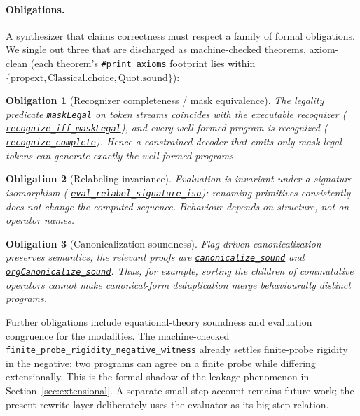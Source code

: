 \documentclass[11pt]{article}
\newcommand{\code}[1]{\texttt{#1}}
\newcommand{\formalcommit}{f3a31db36bb2f944312ee31c1d86c2758109e83a}
\newcommand{\formalblob}{https://github.com/zariuq/MeTTapedia/blob/\formalcommit/lean/mettapedia/Mettapedia}
\newcommand{\leansource}[3]{%
  \href{\formalblob/#1\#L#2}{\nolinkurl{#3}}}
\newtheorem{obligation}{Obligation}
\begin{document}
\paragraph{Obligations.} A synthesizer that claims correctness must respect a family of
formal obligations. We single out three that are discharged as machine-checked theorems,
axiom-clean (each theorem's \code{\#print axioms} footprint lies within
$\{\text{propext}, \text{Classical.choice}, \text{Quot.sound}\}$):
\begin{obligation}[Recognizer completeness / mask equivalence]
The legality predicate \code{maskLegal} on token streams coincides with the executable
recognizer (\leansource{GSLT/LanguageDef/Gauthier/E1.lean}{406-L415}{recognize_iff_maskLegal}),
and every well-formed program is recognized
(\leansource{GSLT/LanguageDef/Gauthier/E1.lean}{492-L499}{recognize_complete}).
Hence a constrained decoder that emits only mask-legal tokens
can generate exactly the well-formed programs.
\end{obligation}
\begin{obligation}[Relabeling invariance]
Evaluation is invariant under a signature isomorphism
(\leansource{GSLT/LanguageDef/Gauthier/E1.lean}{1612-L1628}{eval_relabel_signature_iso}):
renaming primitives consistently does not change the
computed sequence. Behaviour depends on structure, not on operator names.
\end{obligation}
\begin{obligation}[Canonicalization soundness]
Flag-driven canonicalization preserves semantics; the relevant proofs are
\leansource{GSLT/LanguageDef/Gauthier/E1.lean}{1431-L1437}{canonicalize_sound} and
\leansource{GSLT/LanguageDef/Gauthier/E1.lean}{1816-L1823}{orgCanonicalize_sound}.
Thus, for example, sorting the
children of commutative operators cannot make canonical-form deduplication merge
behaviourally distinct programs.
\end{obligation}
Further obligations include equational-theory soundness and evaluation congruence for the
modalities. The machine-checked
\leansource{GSLT/LanguageDef/Gauthier/ProbeRigidity.lean}{73-L79}{finite_probe_rigidity_negative_witness}
already settles finite-probe rigidity in the negative: two programs can agree on a finite
probe while differing extensionally. This is
the formal shadow of the leakage phenomenon in Section~\ref{sec:extensional}. A separate
small-step account remains future work; the present rewrite layer deliberately uses the
evaluator as its big-step relation.
\end{document}
